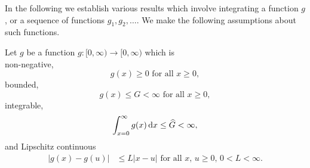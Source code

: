 In the following we establish various results which involve integrating a function \(g\), or a sequence of functions \(g_1,g_2,\dots\). We make the following assumptions about such functions. 
\begin{asu}\label{asu: g}
	Let \(g\) be a function \(g:[0,\infty)\to [0,\infty)\) which is \\
	\subasu \label{asu: g non-neg} non-negative, 
	\[g(x) \geq 0 \mbox{ for all } x \geq 0,\]
	\subasu bounded, 
	\[g(x) \leq G < \infty \mbox{ for all } x \geq 0,\]
	\subasu integrable, 
	\[\int_{x=0}^\infty g(x)\, \mathrm{d} x \leq \widehat G < \infty,\]
	\subasu \label{asu: lipschitz} and Lipschitz continuous 
	\begin{align}
		|g(x) - g(u)|&\leq L|x - u| \mbox{ for all } x,\, u \geq 0,\, 0<L<\infty. \nonumber
	\end{align}
\end{asu}


